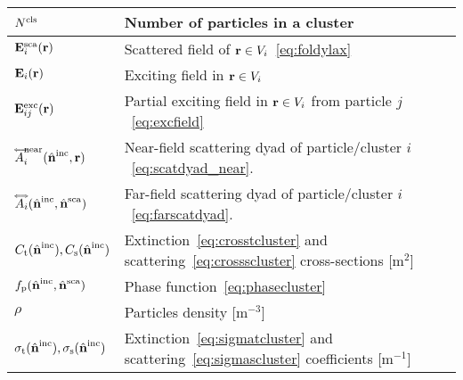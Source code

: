 \begin{table}[h!]
\begin{tabular}{ll}
        $N^\mathrm{cls}$ & Number of particles in a cluster \\
        \hline
        $\mathbf{E}^\mathrm{sca}_i(\mathbf{r})$ & Scattered field of $\mathbf{r}\in V_i$~\eqref{eq:foldylax}\\
        $\mathbf{E}_i(\mathbf{r})$ & Exciting field in $\mathbf{r}\in V_i$ \\
        $\mathbf{E}^\mathrm{exc}_{ij}(\mathbf{r})$ & Partial exciting field in $\mathbf{r}\in V_i$ from particle $j$~\eqref{eq:excfield} \\
        ${\accentset{\Longleftrightarrow}{A}}_i^\text{near}({\hat{\mathbf{n}}}^\mathrm{inc},\mathbf{r})$ & Near-field scattering dyad of particle/cluster $i$~\eqref{eq:scatdyad_near}. \\
        ${\accentset{\Longleftrightarrow}{A}}_i({\hat{\mathbf{n}}}^\mathrm{inc},{\hat{\mathbf{n}}}^\mathrm{sca})$ & Far-field scattering dyad of particle/cluster $i$~\eqref{eq:farscatdyad}. \\
        \hline
        \hline
        $C_\mathrm{t}({\hat{\mathbf{n}}}^\mathrm{inc}),C_\mathrm{s}({\hat{\mathbf{n}}}^\mathrm{inc})$ & Extinction~\eqref{eq:crosstcluster} and scattering~\eqref{eq:crossscluster} cross-sections [m$^{2}$]\\
        $f_\mathrm{p}({\hat{\mathbf{n}}}^\mathrm{inc},{\hat{\mathbf{n}}}^\mathrm{sca})$ & Phase function~\eqref{eq:phasecluster}\\
        $\rho$ & Particles density [m$^{-3}$] \\
        $\sigma_\mathrm{t}({\hat{\mathbf{n}}}^\mathrm{inc}),\sigma_\mathrm{s}({\hat{\mathbf{n}}}^\mathrm{inc})$ & Extinction~\eqref{eq:sigmatcluster} and scattering~\eqref{eq:sigmascluster} coefficients [m$^{-1}$]
    \end{tabular}
\end{table}